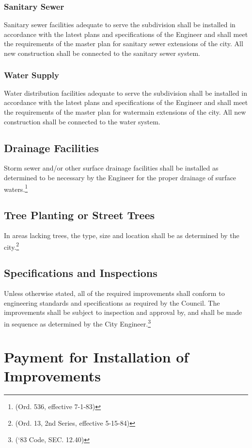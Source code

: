 \subsubsection{Sanitary Sewer}
Sanitary sewer facilities adequate to serve the subdivision shall be installed in accordance with the latest plans and specifications of the Engineer and shall meet the requirements of the master plan for sanitary sewer extensions of the city. All new construction shall be connected to the sanitary sewer system.
\subsubsection{Water Supply}
Water distribution facilities adequate to serve the subdivision shall be installed in accordance with the latest plans and specifications of the Engineer and shall meet the requirements of the master plan for watermain extensions of the city. All new construction shall be connected to the water system.
\subsection{Drainage Facilities}
Storm sewer and/or other surface drainage facilities shall be installed as determined to be necessary by the Engineer for the proper drainage of surface waters.\footnote{(Ord. 536, effective 7-1-83)}
\subsection{Tree Planting or Street Trees}
In areas lacking trees, the type, size and location shall be as determined by the city.\footnote{(Ord. 13, 2nd Series, effective 5-15-84)}
\subsection{Specifications and Inspections}
Unless otherwise stated, all of the required improvements shall conform to engineering standards and specifications as required by the Council. The improvements shall be subject to inspection and approval by, and shall be made in sequence as determined by the City Engineer.\footnote{(‘83 Code, SEC. 12.40)}
\section{Payment for Installation of Improvements}
